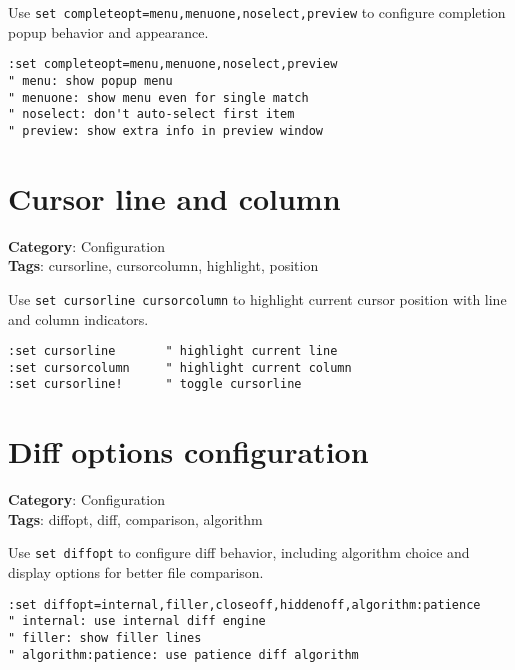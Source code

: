 Use {\footnotesize \Verb§set completeopt=menu,menuone,noselect,preview§} to configure completion popup behavior and appearance.

\begin{Exa*}{}
\begin{Verbatim}[fontsize=\footnotesize, breaklines, breakanywhere]
:set completeopt=menu,menuone,noselect,preview
" menu: show popup menu
" menuone: show menu even for single match
" noselect: don't auto-select first item
" preview: show extra info in preview window
\end{Verbatim}
\end{Exa*}

\section{Cursor line and column}

\textbf{Category}: Configuration\\ \textbf{Tags}: cursorline, cursorcolumn, highlight, position
\vspace{0.5cm}

Use {\footnotesize \Verb§set cursorline cursorcolumn§} to highlight current cursor position with line and column indicators.

\begin{Exa*}{}
\begin{Verbatim}[fontsize=\footnotesize, breaklines, breakanywhere]
:set cursorline       " highlight current line
:set cursorcolumn     " highlight current column
:set cursorline!      " toggle cursorline
\end{Verbatim}
\end{Exa*}

\section{Diff options configuration}

\textbf{Category}: Configuration\\ \textbf{Tags}: diffopt, diff, comparison, algorithm
\vspace{0.5cm}

Use {\footnotesize \Verb§set diffopt§} to configure diff behavior, including algorithm choice and display options for better file comparison.

\begin{Exa*}{}
\begin{Verbatim}[fontsize=\footnotesize, breaklines, breakanywhere]
:set diffopt=internal,filler,closeoff,hiddenoff,algorithm:patience
" internal: use internal diff engine
" filler: show filler lines
" algorithm:patience: use patience diff algorithm
\end{Verbatim}
\end{Exa*}

